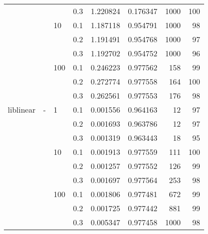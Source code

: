 \begin{table}[H]
\begin{tabular}{llllrrrr}
          &   &     & 0.3 &  1.220824 &  0.176347 &    1000 &   100 \\
          &   & 10  & 0.1 &  1.187118 &  0.954791 &    1000 &    98 \\
          &   &     & 0.2 &  1.191491 &  0.954768 &    1000 &    97 \\
          &   &     & 0.3 &  1.192702 &  0.954752 &    1000 &    96 \\
          &   & 100 & 0.1 &  0.246223 &  0.977562 &     158 &    99 \\
          &   &     & 0.2 &  0.272774 &  0.977558 &     164 &   100 \\
          &   &     & 0.3 &  0.262561 &  0.977553 &     176 &    98 \\
liblinear & - & 1   & 0.1 &  0.001556 &  0.964163 &      12 &    97 \\
          &   &     & 0.2 &  0.001693 &  0.963786 &      12 &    97 \\
          &   &     & 0.3 &  0.001319 &  0.963443 &      18 &    95 \\
          &   & 10  & 0.1 &  0.001913 &  0.977559 &     111 &   100 \\
          &   &     & 0.2 &  0.001257 &  0.977552 &     126 &    99 \\
          &   &     & 0.3 &  0.001697 &  0.977564 &     253 &    98 \\
          &   & 100 & 0.1 &  0.001806 &  0.977481 &     672 &    99 \\
          &   &     & 0.2 &  0.001725 &  0.977442 &     881 &    99 \\
          &   &     & 0.3 &  0.005347 &  0.977458 &    1000 &    98 \\
\bottomrule
\end{tabular}
\end{table}
